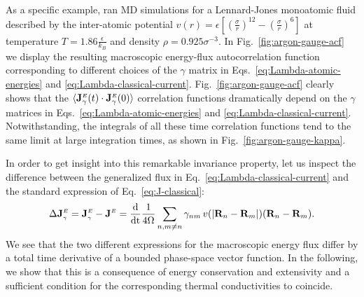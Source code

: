 As a specific example, \cite{Ercole2016} ran MD simulations for a Lennard-Jones monoatomic fluid described by the inter-atomic potential $v(r)=\epsilon \left [ \left ( \frac{\sigma}{r}\right )^{12} - \left ( \frac{\sigma}{r}\right )^{6}\right ] $ at temperature $T=1.86 \frac{\epsilon}{k_B}$ and density $\rho=0.925 \sigma^{-3}$. In Fig.~\ref{fig:argon-gauge-acf} we display the resulting macroscopic energy-flux autocorrelation function corresponding to different choices of the $\gamma$ matrix in Eqs.~\eqref{eq:Lambda-atomic-energies} and \eqref{eq:Lambda-classical-current}. Fig.~\ref{fig:argon-gauge-acf} clearly shows that the $\langle \mathbf{J}^{\scriptscriptstyle E}_{\gamma}(t) \cdot\mathbf{J}^{\scriptscriptstyle E}_{\gamma}(0) \rangle$ correlation functions dramatically depend on the $\gamma$ matrices in Eqs.~\eqref{eq:Lambda-atomic-energies} and \eqref{eq:Lambda-classical-current}.  Notwithstanding, the integrals of all these time correlation functions tend to the same limit at large integration times, as shown in Fig.~\ref{fig:argon-gauge-kappa}.

In order to get insight into this remarkable invariance property, let us inspect the difference between the generalized flux in Eq.~\eqref{eq:Lambda-classical-current} and the standard expression of Eq.~\eqref{eq:J-classical}:
\begin{equation}
  \rDelta\mathbf{J}^\smallE_{\smallgamma} =\mathbf{J}^\smallE_{\smallgamma}-\mathbf{J}^\smallE  =\frac{\mathrm{d}}{\mathrm{dt}}\frac{1}{4 \rOmega} \sum_{n,m\ne n}  \gamma_{nm} \, v(|\mathbf{R}_{n}-\mathbf{R}_{m}|)  (\mathbf{R}_{n}-\mathbf{R}_{m}). \label{eq:DeltaJ}
\end{equation}
We see that the two different expressions for the macroscopic energy flux differ by a total time derivative of a bounded phase-space vector function. In the following, we show that this is a consequence of energy conservation and extensivity and a sufficient condition for the corresponding thermal conductivities to coincide.

